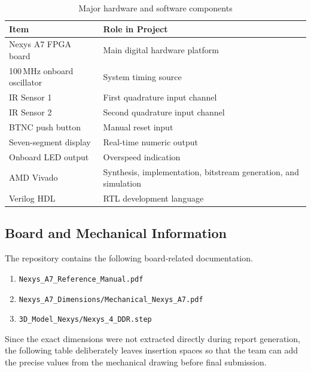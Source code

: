 \documentclass[conference,a4paper]{IEEEtran}
\begin{document}
\begin{table}[H]
\caption{Major hardware and software components}
\centering
\begin{tabular}{|p{2.6cm}|p{5.0cm}|}
\hline
\textbf{Item} & \textbf{Role in Project} \\
\hline
Nexys A7 FPGA board & Main digital hardware platform \\
\hline
100\,MHz onboard oscillator & System timing source \\
\hline
IR Sensor 1 & First quadrature input channel \\
\hline
IR Sensor 2 & Second quadrature input channel \\
\hline
BTNC push button & Manual reset input \\
\hline
Seven-segment display & Real-time numeric output \\
\hline
Onboard LED output & Overspeed indication \\
\hline
AMD Vivado & Synthesis, implementation, bitstream generation, and simulation \\
\hline
Verilog HDL & RTL development language \\
\hline
\end{tabular}
\end{table}

\subsection{Board and Mechanical Information}
The repository contains the following board-related documentation.
\begin{enumerate}
\item \texttt{Nexys\_A7\_Reference\_Manual.pdf}
\item \texttt{Nexys\_A7\_Dimensions/Mechanical\_Nexys\_A7.pdf}
\item \texttt{3D\_Model\_Nexys/Nexys\_4\_DDR.step}
\end{enumerate}

Since the exact dimensions were not extracted directly during report generation, the following table deliberately leaves insertion spaces so that the team can add the precise values from the mechanical drawing before final submission.
\end{document}

